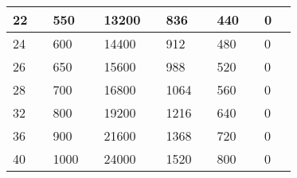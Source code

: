 \begin{table*}[]
\begin{tabular}{|l|l|l|l|l|l|l|l|l|l|l|l|}
22 &    & 550  &    & 13200 &    & 836  &    & 440 &    & 0 &    \\ \hline
24 &    & 600  &    & 14400 &    & 912  &    & 480 &    & 0 &    \\ \hline
26 &    & 650  &    & 15600 &    & 988  &    & 520 &    & 0 &    \\ \hline
28 &    & 700  &    & 16800 &    & 1064 &    & 560 &    & 0 &    \\ \hline
32 &    & 800  &    & 19200 &    & 1216 &    & 640 &    & 0 &    \\ \hline
36 &    & 900  &    & 21600 &    & 1368 &    & 720 &    & 0 &    \\ \hline
40 &    & 1000 &    & 24000 &    & 1520 &    & 800 &    & 0 &    \\ \hline
\end{tabular}
\end{table*}
